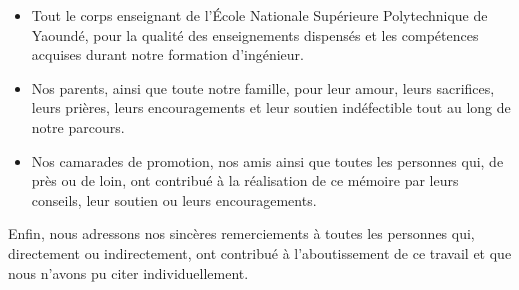 \begin{itemize}
    \item[$\bullet$] Tout le corps enseignant de l'École Nationale Supérieure Polytechnique de Yaoundé, pour la qualité des enseignements dispensés et les compétences acquises durant notre formation d'ingénieur.

    \item[$\bullet$] Nos parents, ainsi que toute notre famille, pour leur amour, leurs sacrifices, leurs prières, leurs encouragements et leur soutien indéfectible tout au long de notre parcours.

    \item[$\bullet$] Nos camarades de promotion, nos amis ainsi que toutes les personnes qui, de près ou de loin, ont contribué à la réalisation de ce mémoire par leurs conseils, leur soutien ou leurs encouragements.

\end{itemize}

\vspace{2mm}

Enfin, nous adressons nos sincères remerciements à toutes les personnes qui, directement ou indirectement, ont contribué à l'aboutissement de ce travail et que nous n'avons pu citer individuellement.


\clearpage